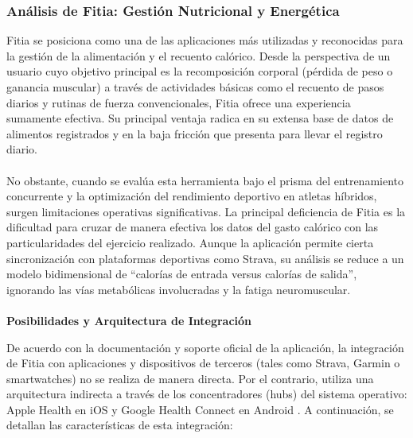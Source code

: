 \documentclass[12pt]{article}
\begin{document}
\subsubsection{Análisis de Fitia: Gestión Nutricional y Energética}
Fitia se posiciona como una de las aplicaciones más utilizadas y reconocidas para la gestión de la alimentación y el recuento calórico. Desde la perspectiva de un usuario cuyo objetivo principal es la recomposición corporal (pérdida de peso o ganancia muscular) a través de actividades básicas como el recuento de pasos diarios y rutinas de fuerza convencionales, Fitia ofrece una experiencia sumamente efectiva. Su principal ventaja radica en su extensa base de datos de alimentos registrados y en la baja fricción que presenta para llevar el registro diario.
\\\\
No obstante, cuando se evalúa esta herramienta bajo el prisma del entrenamiento concurrente y la optimización del rendimiento deportivo en atletas híbridos, surgen limitaciones operativas significativas. La principal deficiencia de Fitia es la dificultad para cruzar de manera efectiva los datos del gasto calórico con las particularidades del ejercicio realizado. Aunque la aplicación permite cierta sincronización con plataformas deportivas como Strava, su análisis se reduce a un modelo bidimensional de ``calorías de entrada versus calorías de salida'', ignorando las vías metabólicas involucradas y la fatiga neuromuscular.
\\\\
\textbf{Posibilidades y Arquitectura de Integración}

De acuerdo con la documentación y soporte oficial de la aplicación, la integración de Fitia con aplicaciones y dispositivos de terceros (tales como Strava, Garmin o smartwatches) no se realiza de manera directa. Por el contrario, utiliza una arquitectura indirecta a través de los concentradores (hubs) del sistema operativo: Apple Health en iOS y Google Health Connect en Android \citep{fitia_sync_health, fitia_import_apple}. A continuación, se detallan las características de esta integración:
\end{document}
